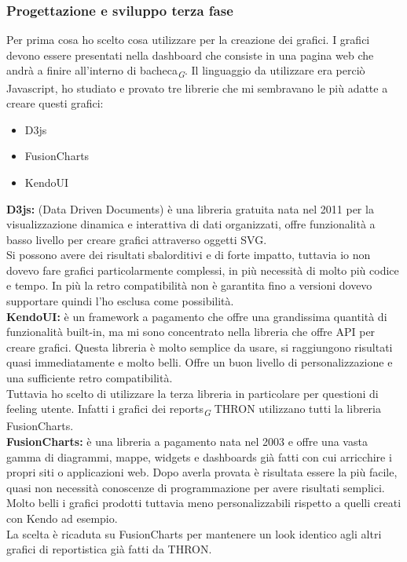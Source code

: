 \documentclass[a4paper, 12pt, twoside, openright]{book}
\newcommand{\gloss}[1]{#1\textsubscript{\textit{\tiny{G}}}}
\begin{document}
\subsubsection{Progettazione e sviluppo terza fase}
Per prima cosa ho scelto cosa utilizzare per la creazione dei grafici. I grafici devono essere presentati nella dashboard che consiste in una pagina web che andrà a finire all'interno di \gloss{bacheca}. Il linguaggio da utilizzare era perciò Javascript, ho studiato e provato tre librerie che mi sembravano le più adatte a creare questi grafici:
\begin{itemize}
	\item D3js
	\item FusionCharts
	\item KendoUI
\end{itemize}
\textbf{D3js:} (Data Driven Documents) è una libreria gratuita nata nel 2011 per la visualizzazione dinamica e interattiva di dati organizzati, offre funzionalità a basso livello per creare grafici attraverso oggetti SVG.\\
Si possono avere dei risultati sbalorditivi e di forte impatto, tuttavia io non dovevo fare grafici particolarmente complessi, in più necessità di molto più codice e tempo. In più la retro compatibilità non è garantita fino a versioni dovevo supportare quindi l'ho esclusa come possibilità.\\
\textbf{KendoUI:} è un framework a pagamento che offre una grandissima quantità di funzionalità built-in, ma mi sono concentrato nella libreria che offre API per creare grafici. Questa libreria è molto semplice da usare, si raggiungono risultati quasi immediatamente e molto belli. Offre un buon livello di personalizzazione e una sufficiente retro compatibilità.\\
Tuttavia ho scelto di utilizzare la terza libreria in particolare per questioni di feeling utente. Infatti i grafici dei \gloss{reports} THRON utilizzano tutti la libreria FusionCharts.\\
\textbf{FusionCharts:} è una libreria a pagamento  nata nel 2003 e offre una vasta gamma di diagrammi, mappe, widgets e dashboards già fatti con cui arricchire i propri siti o applicazioni web. Dopo averla provata è risultata essere la più facile, quasi non necessità conoscenze di programmazione per avere risultati semplici. Molto belli i grafici prodotti tuttavia meno personalizzabili rispetto a quelli creati con Kendo ad esempio.\\
La scelta è ricaduta su FusionCharts per mantenere un look identico agli altri grafici di reportistica già fatti da THRON.\\
\end{document}
